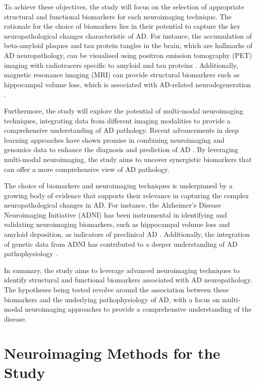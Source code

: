\documentclass[10pt]{article}
\begin{document}
\begin{sloppypar}
  To achieve these objectives, the study will focus on the selection of appropriate structural and functional biomarkers for each neuroimaging technique. The rationale for the choice of biomarkers lies in their potential to capture the key neuropathological changes characteristic of AD. For instance, the accumulation of beta-amyloid plaques and tau protein tangles in the brain, which are hallmarks of AD neuropathology, can be visualised using positron emission tomography (PET) imaging with radiotracers specific to amyloid and tau proteins \citep{bao_pet_2021}. Additionally, magnetic resonance imaging (MRI) can provide structural biomarkers such as hippocampal volume loss, which is associated with AD-related neurodegeneration \citep{besson_cognitive_2015}.

  Furthermore, the study will explore the potential of multi-modal neuroimaging techniques, integrating data from different imaging modalities to provide a comprehensive understanding of AD pathology. Recent advancements in deep learning approaches have shown promise in combining neuroimaging and genomics data to enhance the diagnosis and prediction of AD \citep{lin_deep_2021}. By leveraging multi-modal neuroimaging, the study aims to uncover synergistic biomarkers that can offer a more comprehensive view of AD pathology.

  The choice of biomarkers and neuroimaging techniques is underpinned by a growing body of evidence that supports their relevance in capturing the complex neuropathological changes in AD. For instance, the Alzheimer's Disease Neuroimaging Initiative (ADNI) has been instrumental in identifying and validating neuroimaging biomarkers, such as hippocampal volume loss and amyloid deposition, as indicators of preclinical AD \citep{saykin_genetic_2015}. Additionally, the integration of genetic data from ADNI has contributed to a deeper understanding of AD pathophysiology \citep{saykin_genetic_2015}.

  In summary, the study aims to leverage advanced neuroimaging techniques to identify structural and functional biomarkers associated with AD neuropathology. The hypotheses being tested revolve around the association between these biomarkers and the underlying pathophysiology of AD, with a focus on multi-modal neuroimaging approaches to provide a comprehensive understanding of the disease.

  \section{Neuroimaging Methods for the Study}
  \label{sec:neuroimaging-methods}


\end{sloppypar}
\end{document}
